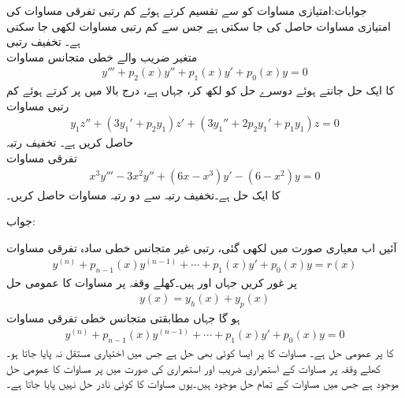 جوابات:امتیازی مساوات کو   سے تقسیم کرتے ہوئے کم رتبی تفرقی مساوات کی امتیازی مساوات حاصل کی جا سکتی ہے جس سے کم رتبی مساوات لکھی جا سکتی ہے۔
\quad تخفیف رتبی\\
متغیر  ضریب  والے خطی متجانس مساوات
\begin{align*}
y'''+p_2(x)y''+p_1(x)y'+p_0(x)y=0
\end{align*}
کا ایک حل  جانتے ہوئے دوسرے حل کو  لکھ کر، جہاں  ہے، درج بالا میں پر کرتے ہوئے کم رتبی مساوات 
\begin{align*}
y_1z''+(3y_1'+p_2y_1)z'+(3y_1''+2p_2y_1'+p_1y_1)z=0
\end{align*}
حاصل کریں  ہے۔
\quad تخفیف رتبہ\\
تفرقی مساوات 
\begin{align*}
x^3y'''-3x^2y''+(6x-x^3)y'-(6-x^2)y=0
\end{align*}
کا ایک حل  ہے۔تخفیف رتبہ سے دو رتبہ مساوات حاصل کریں۔

جواب:

آئیں اب معیاری صورت میں لکھی گئی،  رتبی غیر متجانس خطی سادہ تفرقی مساوات
\begin{align}\label{مساوات_سادہ_بلند_غیر_متجانس_الف}
y^{(n)}+p_{n-1}(x)y^{(n-1)}+\cdots+p_1(x)y'+p_0(x)y=r(x)
\end{align}
پر غور کریں جہاں  اور  ہیں۔کھلے وقفہ  پر مساوات  کا عمومی حل
\begin{align}\label{مساوات_سادہ_بلند_غیر_متجانس_ب}
y(x)=y_h(x)+y_p(x)
\end{align}
ہو گا جہاں  مطابقتی متجانس خطی تفرقی مساوات
\begin{align}\label{مساوات_سادہ_بلند_مطابقتی_متجانس_الف}
y^{(n)}+p_{n-1}(x)y^{(n-1)}+\cdots+p_1(x)y'+p_0(x)y=0
\end{align}
کا  پر عمومی حل ہے۔  مساوات   کا  پر  ایسا کوئی بھی حل ہے جس میں اختیاری مستقل نہ پایا جاتا ہو۔ کھلے وقفہ  پر مساوات  کے استمراری  ضریب  اور استمراری  کی صورت میں  پر مساوات  کا عمومی حل موجود ہے جس میں مساوات  کے تمام حل موجود ہیں۔یوں مساوات  کا کوئی نادر حل نہیں پایا جاتا ہے۔

